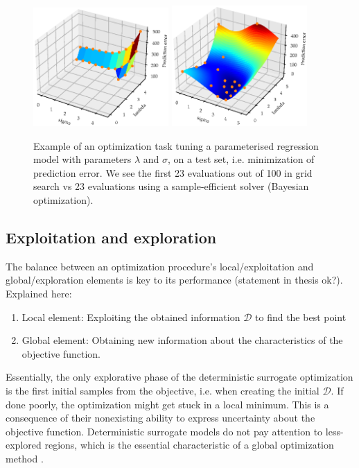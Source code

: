 \begin{figure}[H]%
    \centering
    {\includegraphics[width=0.46\textwidth]{Pictures/BO_vs_Grid2.eps} }%
    \qquad
   {\includegraphics[width=0.46\textwidth]{Pictures/BO_vs_Grid1.eps} }%
    \caption{Example of an optimization task tuning a parameterised regression model with parameters
    $\lambda$ and $\sigma$, on a test set, i.e. minimization of prediction error. We see the first
    23 evaluations out of 100 in grid search vs 23 evaluations using a sample-efficient solver (Bayesian
    optimization).}%
    \label{Sample_efficient_illustration}%
\end{figure}

\subsection{Exploitation and exploration}
The balance between an optimization procedure's local/exploitation and global/exploration elements
is key to its performance (statement in thesis \cite{PhDthesis} ok?). Explained here:
\begin{enumerate}
    \item Local element: Exploiting the obtained information $\mathcal{D}$ to find the best point
    \item Global element: Obtaining new information about the characteristics of the objective
    function.
\end{enumerate}
Essentially, the only explorative phase of the deterministic surrogate optimization is the first
initial samples from the objective, i.e. when creating the initial $\mathcal{D}$. If done poorly,
the optimization might get stuck in a local minimum. This is a consequence of their nonexisting
ability to express uncertainty about the objective function. Deterministic surrogate models do not
pay attention to less-explored regions, which is the essential characteristic of a global
optimization method \cite{GlobalOptimization}. 

